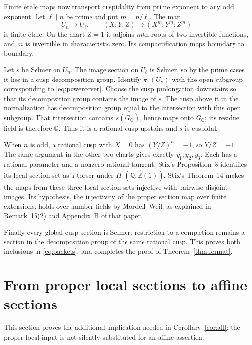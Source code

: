 \documentclass[11pt,a4paper]{article}
\newcommand{\Q}{\mathbb Q}
\newcommand{\Z}{\mathbb Z}
\newcommand{\Zhat}{\widehat{\Z}}
\newcommand{\et}{\'et}
\theoremstyle{plain}
\theoremstyle{definition}
\begin{document}
Finite \et ale maps now transport cuspidality from prime exponent to any
odd exponent. Let $\ell\mid n$ be prime and put $m=n/\ell$. The map
\begin{equation}\label{eq:powercover}
 U_n\longrightarrow U_\ell,\qquad
 (X:Y:Z)\longmapsto(X^m:Y^m:Z^m)
\end{equation}
is finite \et ale. On the chart $Z=1$ it adjoins $m$th roots of
two invertible functions, and $m$ is invertible in characteristic
zero. Its compactification maps boundary to boundary.

Let $s$ be Selmer on $U_n$. The image section on $U_\ell$ is Selmer,
so by the prime cases it lies in a cusp decomposition group.
Identify $\pi_1(U_n)$ with the open subgroup corresponding to
\eqref{eq:powercover}. Choose the cusp prolongation downstairs so
that its decomposition group contains the image of $s$. The cusp
above it in the normalization has decomposition group equal to the
intersection with this open subgroup. That intersection contains
$s(G_\Q)$, hence maps onto $G_\Q$; its residue field is therefore
$\Q$. Thus it is a rational cusp upstairs and $s$ is cuspidal.

When $n$ is odd, a rational cusp with $X=0$ has $(Y/Z)^n=-1$, so
$Y/Z=-1$. The same argument in the other two charts gives exactly
$y_1,y_2,y_3$. Each has a rational parameter and a nonzero rational
tangent. Stix's Proposition~8 identifies its local section set as a
torsor under $H^1(\Q,\Zhat(1))$. Stix's Theorem~14 makes the maps
from these three local section sets injective with pairwise disjoint
images. Its hypothesis, the injectivity of the proper section map
over finite extensions, holds over number fields by Mordell--Weil,
as explained in Remark~15(2) and Appendix~B of that paper.

Finally every global cusp section is Selmer: restriction to a
completion remains a section in the decomposition group of the same
rational cusp. This proves both inclusions in \eqref{eq:packets},
and completes the proof of Theorem~\ref{thm:fermat}.

\section{From proper local sections to affine sections}\label{sec:local}

This section proves the additional implication needed in
Corollary~\ref{cor:all}; the proper local input is not silently
substituted for an affine assertion.
\end{document}
